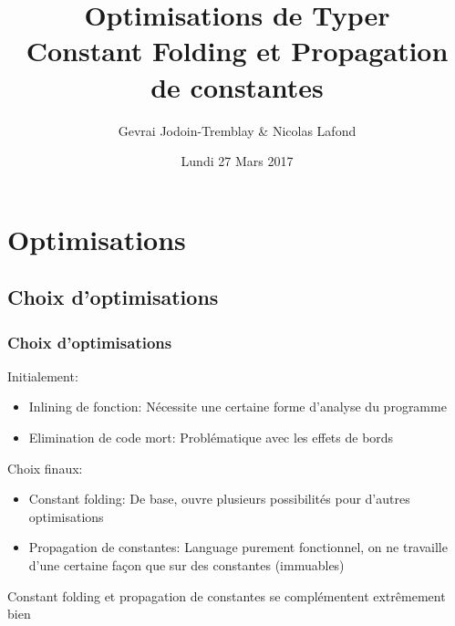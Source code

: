 \documentclass{beamer}
\title[Optimisations Typer]{Optimisations de Typer\\ Constant Folding et Propagation
  de constantes} %
\author{Gevrai Jodoin-Tremblay \& Nicolas Lafond} %
\institute[UDM] %
{
Université de Montréal \\ %
\medskip
}
\date{Lundi 27 Mars 2017} %
\begin{document}
\begin{frame}
\titlepage %
\end{frame}



\section{Optimisations} %
\subsection{Choix d'optimisations} 

\begin{frame}
\frametitle{Choix d'optimisations}

\pause

Initialement: 
  \begin{itemize}
    \item Inlining de fonction: Nécessite une certaine forme d'analyse du programme
    \item Elimination de code mort: Problématique avec les effets de bords
  \end{itemize}
 
\pause

Choix finaux:
  \begin{itemize}
    \item Constant folding: De base, ouvre plusieurs possibilités pour d'autres optimisations
    \item Propagation de constantes: Language purement fonctionnel, on ne
      travaille d'une certaine façon que sur des constantes (immuables)
  \end{itemize}

  Constant folding et propagation de constantes se complémentent extrêmement bien
\end{frame}
\end{document}
